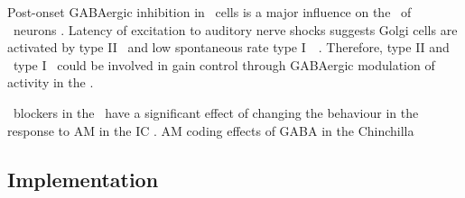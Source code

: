 
Post-onset GABAergic inhibition in \DS~cells is a major influence on the \PSTH~of \OnC~neurons \citep{FerragamoGoldingEtAl:1998a,EvansZhao:1998}.
Latency of excitation to auditory nerve shocks suggests Golgi cells are activated by type II \ANFs~and low spontaneous rate type I~\ANFs~\citep{BensonBerglundEtAl:1996,FerragamoGoldingEtAl:1998}.
Therefore, type II and \LSR~type I \ANFs~could be involved in gain control through GABAergic modulation of activity in the \VCN.


\GABA~blockers in the \VCN~have a significant effect of changing the behaviour in the response to AM in the IC \citep{CasparyPalombiEtAl:2002}.  AM coding effects of GABA in the Chinchilla



\subsection{Implementation}





